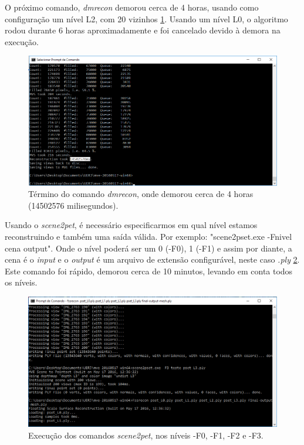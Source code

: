 O próximo comando, \emph{dmrecon} demorou cerca de 4 horas, usando como configuração um nível L2, com 20 vizinhos \ref{fig:MVEDenseRecon}. 
Usando um nível L0, o algoritmo rodou durante 6 horas aproximadamente e foi cancelado devido à demora na execução. 
\newpage %
\begin{figure}[!h]
	\centering
	\includegraphics[width=0.8\linewidth]{figs/umvetempo.png}
	\caption{%
	Término do comando \emph{dmrecon}, onde demorou cerca de 4 horas (14502576 milisegundos).
	}\label{fig:MVEDenseRecon}
\end{figure} 

Usando o \emph{scene2pet}, é necessário especificarmos em qual nível estamos reconstruindo e também uma saída válida. Por exemplo: "scene2pset.exe -Fnivel cena output". Onde o nível poderá ser um 0 (-F0), 1 (-F1) e assim por diante, a cena é o \emph{input} e o \emph{output} é um arquivo de extensão configurável, neste caso \emph{.ply} \ref{fig:MVEScene2Pet}. Este comando foi rápido, demorou cerca de 10 minutos, levando em conta todos os níveis.

\begin{figure}[!h]
	\centering
	\includegraphics[width=0.8\linewidth]{figs/mvemesh.png}
	\caption{%
	Execução dos comandos \emph{scene2pet}, nos níveis -F0, -F1, -F2 e -F3.
	}\label{fig:MVEScene2Pet}
\end{figure} 

